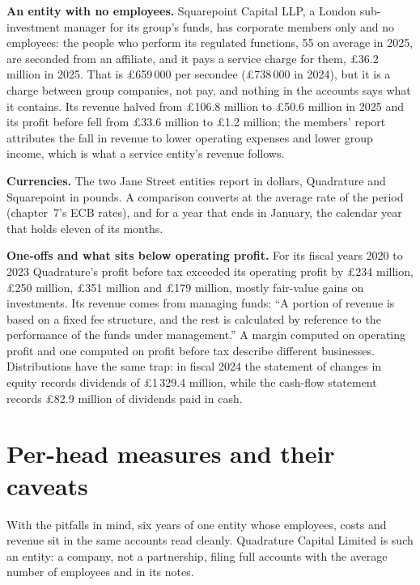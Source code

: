 \textbf{An entity with no employees.} Squarepoint Capital LLP, a London sub-investment manager for its group's funds,
has corporate members only and no employees: the people who perform its regulated functions, 55 on average in 2025, are
seconded from an affiliate, and it pays a service charge for them, \pounds36.2 million in 2025. That is
\pounds659\,000 per secondee (\pounds738\,000 in 2024), but it is a charge between group companies, not pay, and
nothing in the accounts says what it contains. Its revenue halved from \pounds106.8 million to \pounds50.6 million in
2025 and its profit before  fell from \pounds33.6 million to \pounds1.2 million; the members'
report attributes the fall in revenue to lower operating expenses and lower group income, which is what a service
entity's revenue follows.

\textbf{Currencies.} The two Jane Street entities report in dollars, Quadrature and Squarepoint in pounds. A comparison
converts at the average rate of the period (chapter~7's ECB rates), and for a year that ends in January, the calendar
year that holds eleven of its months.

\textbf{One-offs and what sits below operating profit.} For its fiscal years 2020 to 2023 Quadrature's profit before
tax exceeded its operating profit by \pounds234 million, \pounds250 million, \pounds351 million and \pounds179 million,
mostly fair-value gains on investments. Its revenue comes from managing funds: ``A portion of revenue is based on a fixed
fee structure, and the rest is calculated by reference to the performance of the funds under management.'' A margin
computed on operating profit and one computed on profit before tax describe different businesses. Distributions have
the same trap: in fiscal 2024 the statement of changes in equity records dividends of \pounds1\,329.4 million, while the
cash-flow statement records \pounds82.9 million of dividends paid in cash.

\section{Per-head measures and their caveats}

With the pitfalls in mind, six years of one entity whose employees, costs and revenue sit in the same accounts read
cleanly. Quadrature Capital Limited is such an entity: a company, not a partnership, filing full accounts with the
average number of employees and  in its notes.

